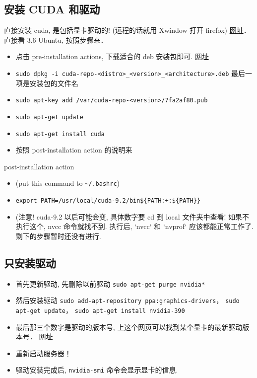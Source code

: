 
\subsection{安装 CUDA 和驱动}
直接安装 cuda, 是包括显卡驱动的! (远程的话就用 Xwindow 打开 firefox)
\href{https://docs.nvidia.com/cuda/cuda-installation-guide-linux/index.html#ubuntu-installation}{网址}． 直接看 3.6 Ubuntu, 按照步骤来．
\begin{itemize}
\item 点击 pre-installation actions, 下载适合的 deb 安装包即可. \href{https://developer.nvidia.com/cuda-downloads}{网址}
\item \verb`sudo dpkg -i cuda-repo-<distro>_<version>_<architecture>.deb`   最后一项是安装包的文件名
\item \verb`sudo apt-key add /var/cuda-repo-<version>/7fa2af80.pub`
\item \verb`sudo apt-get update`
\item \verb`sudo apt-get install cuda`
\item 按照 post-installation action 的说明来
\end{itemize}

post-installation action
\begin{itemize}
\item (put this command to \verb|~/.bashrc|)
\item \verb`export PATH=/usr/local/cuda-9.2/bin${PATH:+:${PATH}}`
\item (注意! cuda-9.2 以后可能会变, 具体数字要 cd 到 local 文件夹中查看!
如果不执行这个, nvcc 命令就找不到. 执行后, `nvcc` 和 `nvprof` 应该都能正常工作了.
剩下的步骤暂时还没有进行.
\end{itemize}

\subsection{只安装驱动}
\begin{itemize}
\item 首先更新驱动, 先删除以前驱动 \verb|sudo apt-get purge nvidia*|
\item 然后安装驱动 \verb|sudo add-apt-repository ppa:graphics-drivers|， \verb|sudo apt-get update|， \verb|sudo apt-get install nvidia-390|
\item 最后那三个数字是驱动的版本号, 上这个网页可以找到某个显卡的最新驱动版本号． \href{http://www.nvidia.com/Download/index.aspx?lang=en-us}{网址}
\item 重新启动服务器！
\item 驱动安装完成后, \verb|nvidia-smi| 命令会显示显卡的信息.
\end{itemize}
